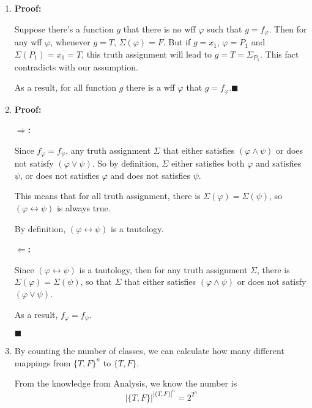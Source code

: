 \documentclass[11pt]{article}
\begin{document}
	\begin{enumerate}
		\item 
		\textbf{Proof:}
		
		Suppose there's a function $g$ that there is no wff $\varphi$ such that $g = f_{\varphi}$. Then for any wff $\varphi$, whenever $g = T$, $\Sigma(\varphi) = F$. But if $g = x_1$, $\varphi = P_1$ and $\Sigma(P_1) = x_1 = T$, this truth assignment will lead to $g = T = \Sigma_{P_1}$. This fact contradicts with our assumption. 
		
		As a result, for all function $g$ there is a wff $\varphi$ that $g = f_{\varphi}$.$\blacksquare$
		
		\item
		\textbf{Proof:}
		
		\textbf{$\Rightarrow$:}
		
		Since $f_{\varphi} = f_{\psi}$, any truth assignment $\Sigma$ that either satisfies $(\varphi \wedge \psi)$ or does not satisfy $(\varphi \vee \psi)$. So by definition, $\Sigma$ either satisfies both $\varphi$ and satisfies $\psi$, or does not satisfies $\varphi$ and does not satisfies $\psi$. 
		
		This means that for all truth assignment, there is $\Sigma(\varphi) = \Sigma(\psi)$, so $(\varphi \leftrightarrow \psi)$ is always true.
		
		By definition, $(\varphi \leftrightarrow \psi)$ is a tautology.
		
		\textbf{$\Leftarrow$:}
		
		Since $(\varphi \leftrightarrow \psi)$ is a tautology, then for any truth assignment $\Sigma$, there is $\Sigma(\varphi) = \Sigma(\psi)$, so that $\Sigma$ that either satisfies $(\varphi \wedge \psi)$ or does not satisfy $(\varphi \vee \psi)$.
		
		As a result, $f_{\varphi} = f_{\psi}$.
		
		$\blacksquare$

		\item By counting the number of classes, we can calculate how many different mappings from $\{T, F\}^n$ to $\{T, F\}$.
		 
		 From the knowledge from Analysis, we know the number is 
		 \[|\{T,F\}|^{|\{T,F\}|^n} = 2^{2^n}\]
	\end{enumerate}
\end{document}
